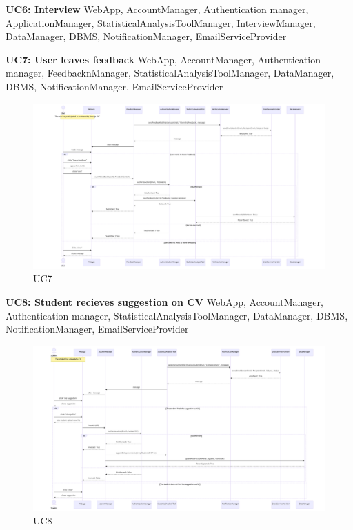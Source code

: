 \newpage
\textbf{UC6: Interview}
WebApp, AccountManager, Authentication manager, ApplicationManager, StatisticalAnalysisToolManager, InterviewManager, DataManager, DBMS, NotificationManager, EmailServiceProvider

\newpage
\textbf{UC7: User leaves feedback}
WebApp, AccountManager, Authentication manager, FeedbacknManager, StatisticalAnalysisToolManager, DataManager, DBMS, NotificationManager, EmailServiceProvider

\begin{figure}[H]
    \centering
    \hspace{-1 cm} %
    \includegraphics[width=1.1\linewidth]{DD//Images/SequenceDiagrams/UC7.pdf}
    \caption{UC7}
\end{figure}

\newpage
\textbf{UC8: Student recieves suggestion on CV}
WebApp, AccountManager, Authentication manager, StatisticalAnalysisToolManager, DataManager, DBMS, NotificationManager, EmailServiceProvider

\begin{figure}[H]
    \centering
    \hspace{-1 cm} %
    \includegraphics[width=1.1\linewidth]{DD//Images/SequenceDiagrams/UC8.pdf}
    \caption{UC8}
\end{figure}

